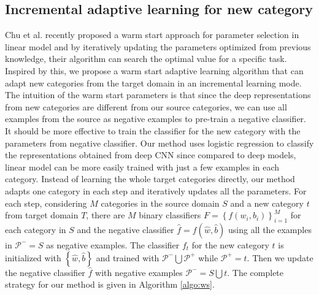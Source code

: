 \subsection{Incremental adaptive learning for new category}
Chu et al. recently proposed a warm start approach for parameter selection in linear model and by iteratively updating the parameters optimized from previous knowledge, their algorithm can search the optimal value for a specific task\cite{chuwarm}. Inspired by this, we propose a warm start adaptive learning algorithm that can adapt new categories from the target domain in an incremental learning mode. The intuition of the warm start parameters is that since the deep representations from new categories are different from our source categories, we can use all examples from the source as negative examples to pre-train a negative classifier. It should be more effective to train the classifier for the new category with the parameters from negative classifier. Our method uses logistic regression to classify the representations obtained from deep CNN since compared to deep models, linear model can be more easily trained with just a few examples in each category. 
Instead of learning the whole target categories directly, our method adapts one category in each step and iteratively updates all the parameters. 
For each step, considering $M$ categories in the source domain $S$ and a new category $t$ from target domain $T$, there are $M$ binary classifiers $F=\left\{ {{f}\left( {{w_i},{b_i}} \right)} \right\}_{i = 1}^M$ for each category in $S$ and the negative classifier $\hat{f}=f(\hat{w},\hat{b})$ using all the examples in $\mathcal{P^-}=S$ as negative examples. The classifier $f_t$ for the new category $t$ is initialized with $\left\{\hat{w},\hat{b}\right\}$ and trained with $\mathcal{P^-}\bigcup\mathcal{P^+}$ while $\mathcal{P^+}=t$. Then we update the negative classifier $\hat{f}$ with negative examples $\mathcal{P^-}=S\bigcup t$. The complete strategy for our method is given in Algorithm \ref{algo:ws}.
